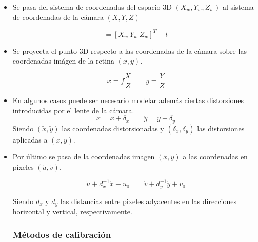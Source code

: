 \begin{itemize}
\item Se pasa del sistema de coordenadas del espacio 3D $(X_w, Y_w, Z_w)$ al sistema de coordenadas de la cámara $(X,Y, Z)$

\begin{equation}
[X \ Y \ Z] = [X_w \ Y_w \ Z_w]^T + t
\end{equation}

\item Se proyecta el punto 3D respecto a las coordenadas de la cámara sobre las coordenadas imágen de la retina $(x,y)$.

\begin{equation}
x=f \dfrac{X}{Z} \qquad y = \dfrac{Y}{Z}
\end{equation}

\item En algunos casos puede ser necesario modelar además ciertas distorsiones introducidas por el lente de la cámara. \\

\begin{equation}
\check{x} = x + \delta_x \qquad \check{y} = y + \delta_y
\end{equation}
Siendo $(\check{x},\check{y})$ las coordenadas distorsionadas y $(\delta_x, \delta_y)$ las distorsiones aplicadas a $(x,y)$.

\item Por último se pasa de la coordenadas imagen $(\check{x}, \check{y})$ a las coordenadas en píxeles $(\check{u}, \check{v})$.

\begin{equation}
\check{u} + d_x ^{-1}\check{x} + u_0 \qquad \check{v} + d_y ^{-1}\check{y} + v_0
\end{equation}

Siendo $d_x$ y $d_y$ las distancias entre pixeles adyacentes en las direcciones horizontal y vertical, respectivamente.\\

\subsubsection{Métodos de calibración}


\end{itemize}








